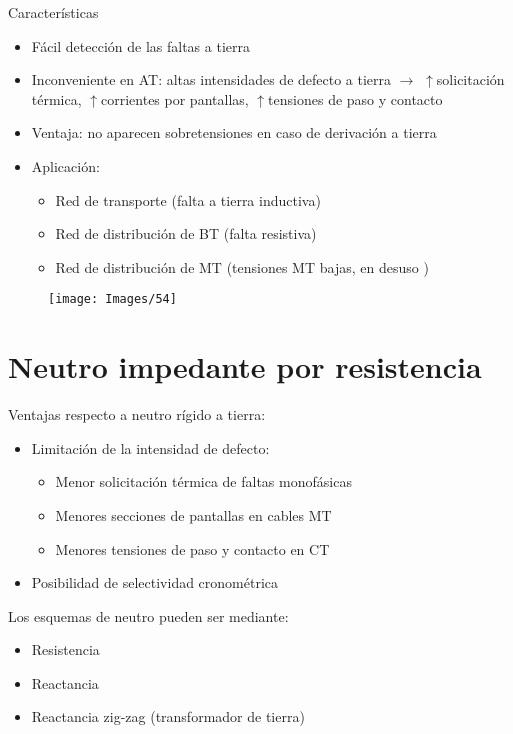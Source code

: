Características
\begin{itemize}
	\item Fácil detección de las faltas a tierra
	\item	Inconveniente en AT: altas intensidades de defecto a tierra $\rightarrow$ $\uparrow$solicitación térmica, $\uparrow$corrientes por pantallas, $\uparrow$tensiones de paso y contacto
	\item	Ventaja: no aparecen sobretensiones en caso de derivación a tierra
	\item Aplicación:
	\begin{itemize}

	\item	Red de transporte (falta a tierra inductiva)
	\item	Red de distribución de BT (falta resistiva)
	\item	Red de distribución de MT	(tensiones MT bajas, en desuso )
\end{itemize}
\end{itemize}
\begin{figure}[H]
	\centering
	\texttt{[image: Images/54]}
	\label{fig:54}
\end{figure}


\section{Neutro impedante por resistencia}
Ventajas respecto a neutro rígido a tierra:
\begin{itemize}
	\item Limitación de la intensidad de defecto:
\begin{itemize}
	\item 	Menor solicitación térmica de faltas monofásicas
	\item Menores secciones de pantallas en cables MT
	\item Menores tensiones de paso y contacto en CT
\end{itemize}

	\item Posibilidad de selectividad cronométrica
\end{itemize}

Los esquemas de neutro pueden ser mediante:
\begin{itemize}
	\item Resistencia
	\item Reactancia
	\item Reactancia zig-zag (transformador de tierra)
\end{itemize}
